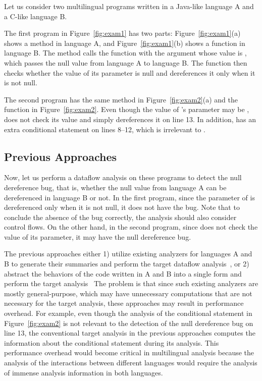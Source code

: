 Let us consider two multilingual programs written in a Java-like language A
and a C-like language B.

The first program in Figure~\ref{fig:exam1} has two parts:
Figure~\ref{fig:exam1}(a) shows a method  in language A,
and Figure~\ref{fig:exam1}(b) shows a function  in language B.
The method  calls the function  with the argument
 whose value is , which passes the null
value from language A to language B. The function  then
checks whether the value of its parameter  is null
and dereferences it only when it is not null.

The second program has the same method in Figure~\ref{fig:exam2}(a)
and the function  in Figure~\ref{fig:exam2}.
Even though the value of 's parameter  may be ,
 does not check its value and simply dereferences it on line 13.
In addition,  has an extra conditional statement on lines 8--12,
which is irrelevant to .

\subsection{Previous Approaches}
Now, let us perform a dataflow analysis on these programs to detect
the null dereference bug, that is, whether the null value from
language A can be dereferenced in language B or not.
In the first program, since the parameter of  is
dereferenced only when it is not null, it does not have the bug.
Note that to conclude the absence of the bug correctly,
the analysis should also consider control flows.
On the other hand, in the second program, since  does not
check the value of its parameter, it may have the null dereference bug.

The previous approaches either 1) utilize existing analyzers for
languages A and B to generate their summaries and perform the
target dataflow analysis~\cite{LeeASE20,JN-SAF}, or 2) abstract 
the behaviors of the code written in A and B into a single form and
perform the target analysis~\cite{hybridroid,sas2021}
The problem is that since such existing analyzers are mostly general-purpose,
which may have unnecessary computations that are not necessary for the target analysis,
these approaches may result in performance overhead.
For example, even though the analysis of the conditional statement in Figure~\ref{fig:exam2}
is not relevant to the detection of the null dereference bug on line 13,
the conventional target analysis in the previous approaches computes
the information about the conditional statement during its analysis.
This performance overhead would become critical in multilingual analysis
because the analysis of the interactions between different languages would require
the analysis of immense analysis information in both languages.


